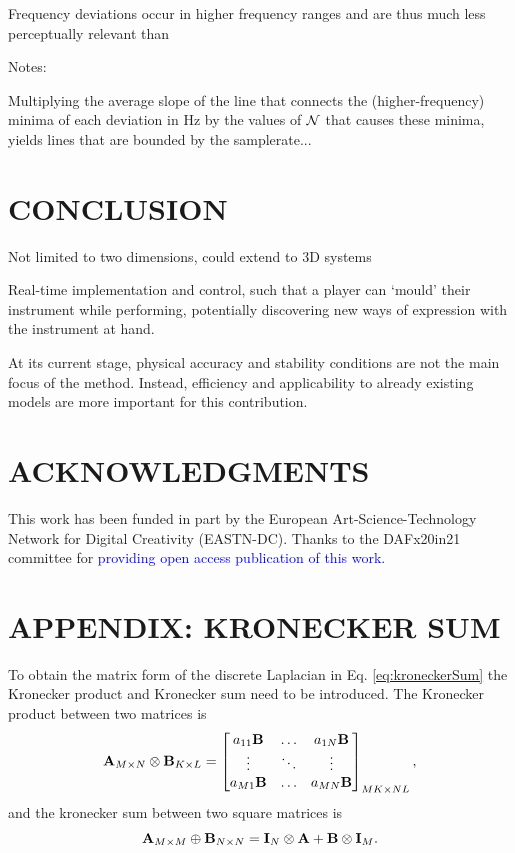 \documentclass[fleqn]{jaes}
\def\SWcomment[#1]{\textcolor{blue}{#1}}
\begin{document}
Frequency deviations occur in higher frequency ranges and are thus much less perceptually relevant than 

Notes:

Multiplying the average slope of the line that connects the (higher-frequency) minima of each deviation in Hz by the values of $\mathcal{N}$ that causes these minima, yields lines that are bounded by the samplerate...



\section{CONCLUSION}\label{sec:conclusion}
Not limited to two dimensions, could extend to 3D systems

Real-time implementation and control, such that a player can `mould' their instrument while performing, potentially discovering new ways of expression with the instrument at hand.   

At its current stage, physical accuracy and stability conditions are not the main focus of the method. Instead, efficiency and applicability to already existing models are more important for this contribution.


\section{ACKNOWLEDGMENTS}
This  work  has  been  funded  in  part  by  the European Art-Science-Technology Network for Digital Creativity (EASTN-DC). Thanks to the DAFx20in21 committee for \SWcomment[providing open access publication of this work].




\appendix
\section*{APPENDIX: KRONECKER SUM}\label{app:kronecker}
To obtain the matrix form of the discrete Laplacian in Eq. \eqref{eq:kroneckerSum} the Kronecker product and Kronecker sum need to be introduced. The Kronecker product between two matrices is \cite{Horn1991}
\begin{equation}
    \mathbf{A}_{M\times N} \otimes \mathbf{B}_{K\times L} = \begin{bmatrix}
        a_{11}\mathbf{B} & \hdots & a_{1N}\mathbf{B}\\
        \vdots & \ddots & \vdots\\
        a_{M1}\mathbf{B} & \hdots & a_{MN}\mathbf{B}\\
    \end{bmatrix}_{MK \times NL},
\end{equation}
and the kronecker sum between two square matrices is \cite{Hamilton2016}
\begin{equation}\label{eq:kronSum}
    \A_{M \times M} \oplus \B_{N \times N} = \I_N\otimes \A + \B \otimes\I_M.
\end{equation}
\end{document}
